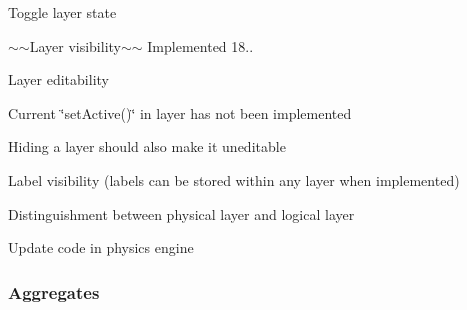 \begin{DoxyItemize}
\begin{DoxyItemize}
\end{DoxyItemize}
\item Toggle layer state
\begin{DoxyItemize}
\item $\sim$$\sim$\+Layer visibility$\sim$$\sim$ Implemented 18..
\item Layer editability
\begin{DoxyItemize}
\item Current \char`\"{}set\+Active()\char`\"{} in layer has not been implemented
\item Hiding a layer should also make it uneditable
\end{DoxyItemize}
\item Label visibility (labels can be stored within any layer when implemented)
\end{DoxyItemize}
\item Distinguishment between physical layer and logical layer
\begin{DoxyItemize}
\item Update code in physics engine
\end{DoxyItemize}
\end{DoxyItemize}

\subsubsection*{Aggregates}


